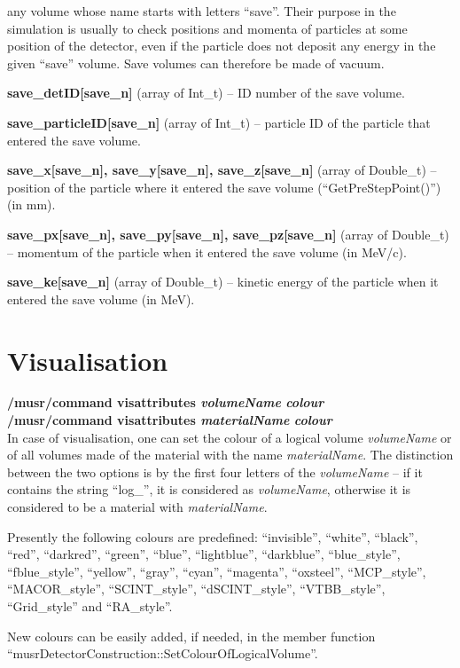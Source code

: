 \documentclass[twoside]{dis04}
\begin{document}
\begin{description}
	any volume whose name starts with letters ``save''.  Their purpose in the simulation is usually to check positions
        and momenta of particles at some position of the detector, even if the particle does not deposit any energy in
        the given ``save'' volume.  Save volumes can therefore be made of vacuum.
\item{\bf save\_detID[save\_n]} (array of Int\_t) --  ID number of the save volume.
\item{\bf save\_particleID[save\_n]} (array of Int\_t) -- particle ID of the particle that entered the save volume.
\item{\bf save\_x[save\_n], save\_y[save\_n], save\_z[save\_n]} (array of Double\_t) -- position of the particle where it
        entered the save volume (``GetPreStepPoint()'') (in mm).
\item{\bf save\_px[save\_n], save\_py[save\_n], save\_pz[save\_n]} (array of Double\_t) -- momentum of the particle when it
        entered the save volume (in MeV/c). 
\item{\bf save\_ke[save\_n]} (array of Double\_t) -- kinetic energy of the particle when it
        entered the save volume (in MeV). 
\end{description}
\section{Visualisation}

\begin{description}
\item{\bf /musr/command visattributes \emph{volumeName} \emph{colour}}\\
     {\bf /musr/command visattributes \emph{materialName} \emph{colour}}\\
	In case of visualisation,	
	one can set the colour of a logical volume \emph{volumeName} or of all volumes made
	of the material with the name \emph{materialName}.  The distinction between the
	two options is by the first four letters of the \emph{volumeName} -- if it contains
	the string ``log\_'', it is considered as \emph{volumeName}, otherwise it is
	considered to be a material with \emph{materialName}.

	Presently the following colours are predefined: ``invisible'', ``white'', ``black'', 
	``red'', ``darkred'', ``green'', 
	``blue'', ``lightblue'', ``darkblue'', ``blue\_style'', ``fblue\_style'',
	``yellow'', ``gray'', ``cyan'', ``magenta'',
	``oxsteel'', ``MCP\_style'', ``MACOR\_style'', ``SCINT\_style'',
	``dSCINT\_style'', ``VTBB\_style'', ``Grid\_style'' and ``RA\_style''.

	New colours can be easily added, if needed, in the member function
	``musrDetectorConstruction::SetColourOfLogicalVolume''.

\end{description}
\end{document}
